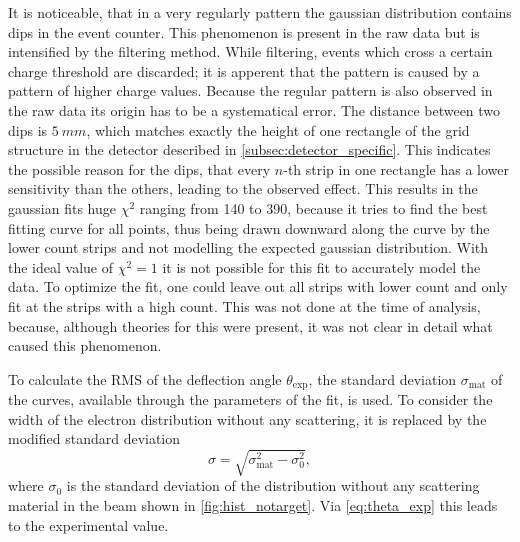 \documentclass[sn-mathphys-num,iicol]{sn-jnl}
\theoremstyle{thmstyleone}
\theoremstyle{thmstyletwo}
\theoremstyle{thmstylethree}
\begin{document}
It is noticeable, that in a very regularly pattern the gaussian distribution contains dips in the event counter. %
This phenomenon is present in the raw data but is intensified by the filtering method.
While filtering, events which cross a certain charge threshold are discarded; it is apperent that the pattern is caused by a pattern of higher charge values.
Because the regular pattern is also observed in the raw data its origin has to be a systematical error. 
The distance between two dips is $\SI{5}{mm}$, which matches exactly the height of one rectangle of the grid structure in the detector described in \autoref{subsec:detector_specific}. 
This indicates the possible reason for the dips, that every $n$-th strip in one rectangle has a lower sensitivity than the others, leading to the observed effect.
This results in the gaussian fits huge $\chi ^2$ ranging from 140 to 390, because it tries to find the best fitting curve for all points, thus being drawn downward along the curve by the lower count strips and not modelling the expected gaussian distribution.
With the ideal value of $\chi ^2=1$ it is not possible for this fit to accurately model the data.
To optimize the fit, one could leave out all strips with lower count and only fit at the strips with a high count.
This was not done at the time of analysis, because, although theories for this were present, it was not clear in detail what caused this phenomenon.

To calculate the RMS of the deflection angle $\theta_\text{exp}$, the standard deviation $\sigma_\text{mat}$ of the curves, available through the parameters of the fit, is used. To consider the width of the electron distribution without any scattering, it is replaced by the modified standard deviation
\begin{equation} \label{eq:sigma_mod}
  \sigma = \sqrt{\sigma_\text{mat}^2 - \sigma_\text{0}^2},
\end{equation}
where $\sigma_\text{0}$ is the standard deviation of the distribution without any scattering material in the beam shown in \autoref{fig:hist_notarget}. 
Via \autoref{eq:theta_exp} this leads to the experimental value.
\end{document}
